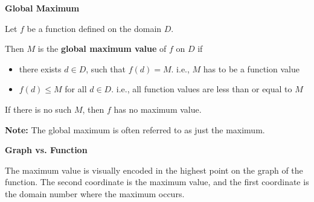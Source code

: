 \documentclass{ximera}
\begin{document}
\begin{definition} \textbf{\textcolor{green!50!black}{Global Maximum}} 


Let $f$ be a function defined on the domain $D$.

Then $M$ is the \textbf{global maximum value} of $f$ on $D$ if    


\begin{itemize}
\item there exists $d \in D$, such that $f(d) = M$.   i.e., $M$ has to be a function value 
\item $f(d) \leq M$ for all $d \in D$. i.e., all function values are less than or equal to $M$ 

\end{itemize}


If there is no such $M$, then $f$ has no maximum value.


\textbf{Note:} The global maximum is often referred to as just the maximum.

\end{definition}



\begin{observation}\textbf{\textcolor{-red!75}{Graph vs. Function}}

The maximum value is visually encoded in the highest point on the graph of the function.  The second coordinate is the maximum value, and the first coordinate is the domain number where the maximum occurs.
\end{observation}
\end{document}
